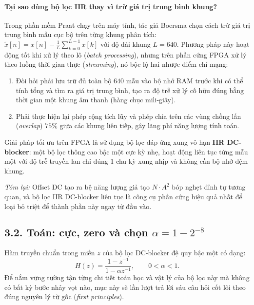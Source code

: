 \paragraph{Tại sao dùng bộ lọc IIR thay vì trừ giá trị trung bình khung?}
Trong phần mềm Praat chạy trên máy tính, tác giả Boersma chọn cách trừ giá trị trung bình mẫu cục bộ trên từng khung phân tích: $\tilde{x}[n] = x[n] - \frac{1}{L}\sum_{k=0}^{L-1} x[k]$ với độ dài khung $L = 640$. Phương pháp này hoạt động tốt khi xử lý theo lô (\emph{batch processing}), nhưng trên phần cứng FPGA xử lý theo luồng thời gian thực (\emph{streaming}), nó bộc lộ hai nhược điểm chí mạng:
\begin{enumerate}
    \item Đòi hỏi phải lưu trữ đủ toàn bộ $640$ mẫu vào bộ nhớ RAM trước khi có thể tính tổng và tìm ra giá trị trung bình, tạo ra độ trễ xử lý cố hữu đúng bằng thời gian một khung âm thanh (hàng chục mili-giây).
    \item Phải thực hiện lại phép cộng tích lũy và phép chia trên các vùng chồng lấn (\emph{overlap}) $75\%$ giữa các khung liên tiếp, gây lãng phí năng lượng tính toán.
\end{enumerate}
Giải pháp tối ưu trên FPGA là sử dụng bộ lọc đáp ứng xung vô hạn \textbf{IIR DC-blocker}: một bộ lọc thông cao bậc một cực kỳ nhẹ, hoạt động liên tục từng mẫu một với độ trễ truyền lan chỉ đúng 1 chu kỳ xung nhịp và không cần bộ nhớ đệm khung.

\textit{Tóm lại:} Offset DC tạo ra bệ năng lượng giả tạo $N\cdot A^2$ bóp nghẹt đỉnh tự tương quan, và bộ lọc IIR DC-blocker liên tục là công cụ phần cứng hiệu quả nhất để loại bỏ triệt để thành phần này ngay từ đầu vào.

\subsection*{3.2. Toán: cực, zero và chọn $\alpha = 1 - 2^{-8}$}

Hàm truyền chuẩn trong miền $z$ của bộ lọc DC-blocker đệ quy bậc một có dạng:
\begin{equation}
H(z) = \frac{1 - z^{-1}}{1 - \alpha z^{-1}}, \qquad 0 < \alpha < 1.
\end{equation}
Để nắm vững tường tận từng chi tiết toán học và vật lý của bộ lọc này mà không có bất kỳ bước nhảy vọt nào, mục này sẽ lần lượt trả lời sáu câu hỏi cốt lõi theo đúng nguyên lý từ gốc (\emph{first principles}).


